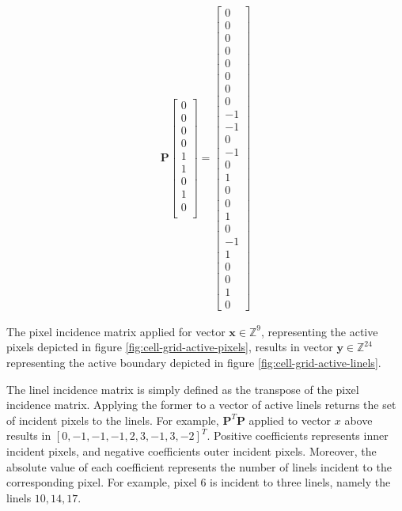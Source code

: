 \begin{example}
\[\begin{array}{ll}
	\mathbf{P} \left[ \begin{array}{l}
					0\\
					0\\
					0\\
					0\\
					1\\
					1\\
					0\\
					1\\
					0\\
					\end{array}\right] =  \left[ \begin{array}{l}
											0\\
											0\\
											0\\
											0\\
											0\\
											0\\
											0\\
											0\\
											-1\\
											-1\\
											0\\
											-1\\
											0\\
											1\\
											0\\
											0\\
											1\\
											0\\
											-1\\
											1\\
											0\\
											0\\
											1\\
											0
										\end{array}\right]
	 
   \end{array}
\]



The pixel incidence matrix applied for vector $\mathbf{x} \in \mathbb{Z}^9$, representing the active pixels depicted in figure \ref{fig:cell-grid-active-pixels}, results in vector $\mathbf{y} \in \mathbb{Z}^{24}$ representing the active boundary depicted in figure \ref{fig:cell-grid-active-linels}.

The linel incidence matrix is simply defined as the transpose of the pixel incidence matrix. Applying the former to a vector of active linels returns the set of incident pixels to the linels. For example, $\mathbf{P}^{T}\mathbf{P}$ applied to vector $x$ above results in $[0,-1,-1,-1,2,3,-1,3,-2]^T$. Positive coefficients represents inner incident pixels, and negative coefficients outer incident pixels. Moreover, the absolute value of each coefficient represents the number of linels incident to the corresponding pixel. For example, pixel $6$ is incident to three linels, namely the linels $10,14,17$.

\end{example}


